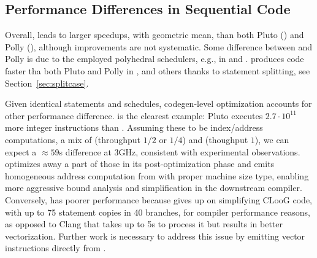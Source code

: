 \subsection{Performance Differences in Sequential Code}\label{sec:perf_analysis}
Overall, \tool leads to larger speedups, with \toolseqspeedup geometric mean, than both Pluto (\plutoseqspeedup) and Polly (\pollyseqspeedup), although improvements are not systematic. Some difference between \tool and Polly is due to the employed polyhedral schedulers, e.g., in  and . \tool produces code faster tha both Pluto and Polly in \icode{2mm}, \icode{3mm} and others thanks to statement splitting, see Section~\ref{sec:splitcase}.

Given identical statements and schedules, codegen-level optimization accounts for other performance difference.  is the clearest example: Pluto executes $2.7\!\cdot\!10^{11}$ more integer instructions than \tool. Assuming these to be index/address computations, a mix of  (throughput $1/2$ or $1/4$) and  (thoughput $1$), we can expect a $\approx 59$s difference at 3GHz, consistent with experimental observations. \tool optimizes away a part of those in its post-optimization phase and emits homogeneous address computation from \memref with proper machine size type, enabling more aggressive bound analysis and simplification in the downstream compiler. Conversely,  has poorer performance because \tool gives up on simplifying CLooG code, with up to 75 statement copies in 40 branches, for compiler performance reasons, as opposed to Clang that takes up to 5s to process it but results in better vectorization. Further work is necessary to address this issue by emitting vector instructions directly from \tool.



